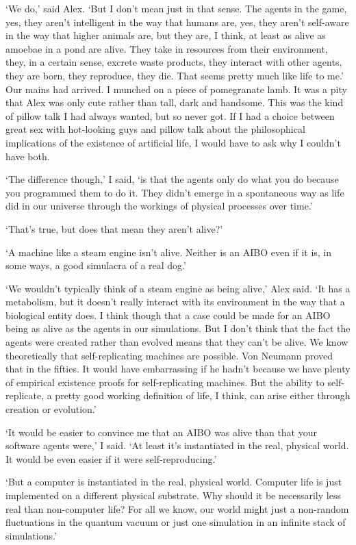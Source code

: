 `We do,' said Alex. `But I don't mean just in that sense. The agents in
the game, yes, they aren't intelligent in the way that humans are,
yes, they aren't self-aware in the way that higher animals are, but
they are, I think, at least as alive as amoebae in a pond are alive. They take in
resources from their environment, they, in a certain sense, excrete waste products, they interact with other agents, they are born, they
reproduce, they die. That seems pretty much like life to me.' Our mains had arrived. I
munched on a piece of pomegranate lamb. It was a pity that Alex was
only cute rather than tall, dark and handsome. This was the kind of pillow talk I had
always wanted, but so never got. If I had a choice between great
sex with hot-looking guys and pillow talk about the philosophical
implications of the existence of artificial life, I would have to ask why I
couldn't have both.

`The difference though,' I said, `is that the agents only do what you
do because you programmed them to do it. They didn't emerge
in a spontaneous way as life did in our universe through the
workings of physical processes over time.'

`That's true, but does that mean they aren't alive?'

`A machine like a steam engine isn't alive. Neither is an
AIBO even if it is, in some ways, a good simulacra of a real dog.'

`We wouldn't typically think of a steam engine as being alive,' Alex
said. `It has a metabolism, but it doesn't really interact with its
environment in the way that a biological entity does. I think though that a case could be made for an AIBO being as
alive as the agents in our simulations. But I don't think that the
fact the agents were created rather than evolved means that they
can't be alive. We know theoretically that self-replicating machines
are possible. Von Neumann proved that in the fifties. It would have
embarrassing if he hadn't because we have plenty of empirical
existence proofs for self-replicating machines. But the ability to
self-replicate, a pretty good working definition of life, I think,
can arise either through creation or evolution.'

`It would be easier to convince me that an AIBO was alive than that
your software agents were,' I said. `At least it's instantiated in
the real, physical world. It would be even easier if it were self-reproducing.'

`But a computer is instantiated in the real, physical world. Computer life is just
implemented on a different physical substrate. Why should it be
necessarily less real than non-computer life? For all we know, our
world might just a non-random fluctuations in the quantum vacuum or just one simulation in an infinite stack of simulations.'

